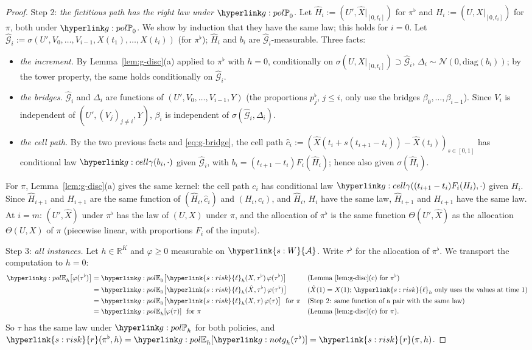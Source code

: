 \documentclass[11pt]{article}
\DeclareRobustCommand{\sy}[2]{{\hyperlink{#1}{#2}}}
\newcommand{\R}{\mathbb{R}}
\newcommand{\1}{\mathbf{1}}
\newcommand{\Al}{\sy{s:W}{\mathcal A}}
\newcommand{\rk}{\sy{s:risk}{r}}
\newcommand{\lh}{\sy{s:risk}{\ell}}
\begin{document}
\begin{proof}
Step 2: \emph{the fictitious path has the right law under $\gPh_0$.} Let $\hat H_i:=(U',\hat X|_{[0,t_i]})$ for $\pi^\flat$ and $H_i:=(U,X|_{[0,t_i]})$ for $\pi$, both under
$\gPh_0$. We show by induction that they have the same law; this holds for $i=0$. Let $\hat{\mathcal G}_i:=\sigma(U',V_0,\dots,V_{i-1},X(t_1),\dots,X(t_i))$ (for $\pi^\flat$);
$\hat H_i$ and $b_i$ are $\hat{\mathcal G}_i$-measurable. Three facts:
\begin{itemize}
\item \emph{the increment.} By Lemma~\ref{lem:g-disc}(a) applied to $\pi^\flat$ with $h=0$, conditionally on $\sigma(U,X|_{[0,t_i]})\supset\hat{\mathcal G}_i$, $\Delta_i\sim\mathcal N(0,\mathrm{diag}(b_i))$;
by the tower property, the same holds conditionally on $\hat{\mathcal G}_i$.
\item \emph{the bridges.} $\hat{\mathcal G}_i$ and $\Delta_i$ are functions of $(U',V_0,\dots,V_{i-1},Y)$ (the proportions $p^\flat_j$, $j\le i$, only use the bridges
$\beta_0,\dots,\beta_{i-1}$). Since $V_i$ is independent of $(U',(V_j)_{j\ne i},Y)$, $\beta_i$ is independent of $\sigma(\hat{\mathcal G}_i,\Delta_i)$.
\item \emph{the cell path.} By the two previous facts and \eqref{eq:g-bridge}, the cell path $\hat c_i:=(\hat X(t_i+s(t_{i+1}-t_i))-\hat X(t_i))_{s\in[0,1]}$ has
conditional law $\ggam(b_i,\cdot)$ given $\hat{\mathcal G}_i$, with $b_i=(t_{i+1}-t_i)F_i(\hat H_i)$; hence also given $\sigma(\hat H_i)$.
\end{itemize}
For $\pi$, Lemma~\ref{lem:g-disc}(a) gives the same kernel: the cell path $c_i$ has conditional law $\ggam((t_{i+1}-t_i)F_i(H_i),\cdot)$ given $H_i$. Since $\hat H_{i+1}$
and $H_{i+1}$ are the same function of $(\hat H_i,\hat c_i)$ and $(H_i,c_i)$, and $\hat H_i$, $H_i$ have the same law, $\hat H_{i+1}$ and $H_{i+1}$ have the same law.
At $i=m$: $(U',\hat X)$ under $\pi^\flat$ has the law of $(U,X)$ under $\pi$, and the allocation of $\pi^\flat$ is the same function $\Theta(U',\hat X)$ as the
allocation $\Theta(U,X)$ of $\pi$ (piecewise linear, with proportions $F_i$ of the inputs).

Step 3: \emph{all instances.} Let $h\in\R^K$ and $\varphi\ge0$ measurable on $\Al$. Write $\tau^\flat$ for the allocation of $\pi^\flat$. We transport the computation
to $h=0$:
\begin{align*}
\gEh_h\big[\varphi(\tau^\flat)\big]&=\gEh_0\big[\lh_h(X,\tau^\flat)\,\varphi(\tau^\flat)\big] &&\text{(Lemma~\ref{lem:g-disc}(c) for }\pi^\flat\text{)}\\
&=\gEh_0\big[\lh_h(\hat X,\tau^\flat)\,\varphi(\tau^\flat)\big] &&\text{(}\hat X(1)=X(1)\text{; }\lh_h\text{ only uses the values at time }1\text{)}\\
&=\gEh_0\big[\lh_h(X,\tau)\,\varphi(\tau)\big]\ \text{ for }\pi &&\text{(Step 2: same function of a pair with the same law)}\\
&=\gEh_h[\varphi(\tau)]\ \text{ for }\pi &&\text{(Lemma~\ref{lem:g-disc}(c) for }\pi\text{)}.
\end{align*}
So $\tau$ has the same law under $\gPh_h$ for both policies, and $\rk(\pi^\flat,h)=\gEh_h[\ggh_h(\tau^\flat)]=\rk(\pi,h)$.
\end{proof}
\end{document}
